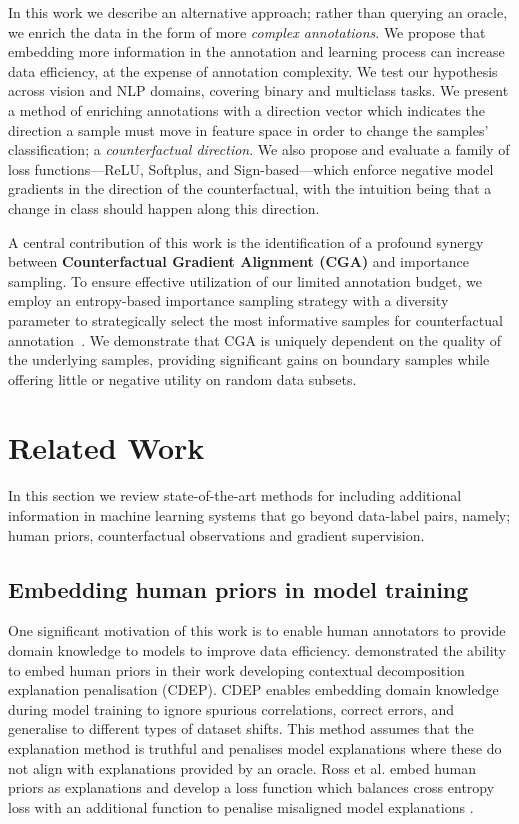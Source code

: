 \documentclass[sigconf,anonymous]{aamas}
\begin{document}
In this work we describe an alternative approach; rather than querying an oracle, we enrich the data in the form of more \emph{complex annotations}. We propose that embedding more information in the annotation and learning process can increase data efficiency, at the expense of annotation complexity. We test our hypothesis across vision and NLP domains, covering binary and multiclass tasks. We present a method of enriching annotations with a direction vector which indicates the direction a sample must move in feature space in order to change the samples' classification; a \emph{counterfactual direction}. We also propose and evaluate a family of loss functions---ReLU, Softplus, and Sign-based---which enforce negative model gradients in the direction of the counterfactual, with the intuition being that a change in class should happen along this direction. 

A central contribution of this work is the identification of a profound synergy between \textbf{Counterfactual Gradient Alignment (CGA)} and importance sampling. To ensure effective utilization of our limited annotation budget, we employ an entropy-based importance sampling strategy with a diversity parameter to strategically select the most informative samples for counterfactual annotation~\cite{he2014active}. We demonstrate that CGA is uniquely dependent on the quality of the underlying samples, providing significant gains on boundary samples while offering little or negative utility on random data subsets.

\section{Related Work}
\label{related_work}

In this section we review state-of-the-art methods for including additional information in machine learning systems that go beyond data-label pairs, namely; human priors, counterfactual observations and gradient supervision.

\subsection{Embedding human priors in model training}
One significant motivation of this work is to enable human annotators to provide domain knowledge to models to improve data efficiency. \citeauthor{rieger2020interpretations} \cite{rieger2020interpretations} demonstrated the ability to embed human priors in their work developing contextual decomposition explanation penalisation (CDEP). CDEP enables embedding domain knowledge during model training to ignore spurious correlations, correct errors, and generalise to different types of dataset shifts. This method assumes that the explanation method is truthful and penalises model explanations where these do not align with explanations provided by an oracle. Ross et al. embed human priors as explanations and develop a loss function which balances cross entropy loss with an additional function to penalise misaligned model explanations \cite{ross2017right}.
\end{document}
